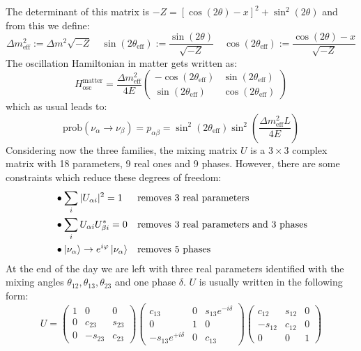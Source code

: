 \documentclass[10.75pt,a4paper,openright,bottom=2cm]{article}
\begin{document}
The determinant of this matrix is $-Z=[\cos(2\theta)-x]^2+\sin^2(2\theta)$ and from this we define:
\[
\Delta m^2_{\text{eff}}:=\Delta m^2\sqrt{-Z} \quad \sin(2\theta_{\text{eff}}):=\frac{\sin(2\theta)}{\sqrt{-Z}} \quad \cos(2\theta_{\text{eff}}):=\frac{\cos(2\theta)-x}{\sqrt{-Z}}
\]
The oscillation Hamiltonian in matter gets written as:
\[
H_{\text{osc}}^{\text{matter}}=\frac{\Delta m^2_{\text{eff}}}{4E}\left(\begin{array}{cc}
    -\cos(2\theta_{\text{eff}}) & \sin(2\theta_{\text{eff}}) \\
    \sin(2\theta_{\text{eff}}) & \cos(2\theta_{\text{eff}})
\end{array}\right)
\]
which as usual leads to:
\[
\text{prob}(\nu_\alpha\to\nu_\beta)=p_{\alpha\beta}=\sin^2(2\theta_{\text{eff}})\sin^2\left(\frac{\Delta m^2_{\text{eff}}L}{4E}\right)
\]
Considering now the three families, the mixing matrix $U$ is a $3\times3$ complex matrix with 18 parameters, 9 real ones and 9 phases. However, there are some constraints which reduce these degrees of freedom:
\[
\begin{aligned}
&\bullet \sum_i|U_{\alpha i}|^2=1 &&\text{removes 3 real parameters}\\
&\bullet \sum_iU_{\alpha i}U_{\beta i}^*=0 &&\text{removes 3 real parameters and 3 phases}\\
&\bullet \ket{\nu_\alpha}\to e^{i\varphi}\ket{\nu_\alpha} &&\text{removes 5 phases}
\end{aligned}
\]
At the end of the day we are left with three real parameters identified with the mixing angles $\theta_{12}, \theta_{13}, \theta_{23}$ and one phase $\delta$. $U$ is usually written in the following form:
\[
U=\begin{pmatrix}
    1 & 0 & 0\\
    0 & c_{23} & s_{23}\\
    0 & -s_{23} & c_{23}
\end{pmatrix}
\begin{pmatrix}
    c_{13} & 0 & s_{13}e^{-i\delta}\\
    0 & 1 & 0\\
    -s_{13}e^{+i\delta} & 0 & c_{13}
\end{pmatrix}
\begin{pmatrix}
    c_{12} & s_{12} & 0\\
    -s_{12} & c_{12} & 0\\
    0 & 0 & 1
\end{pmatrix}
\]
\end{document}
